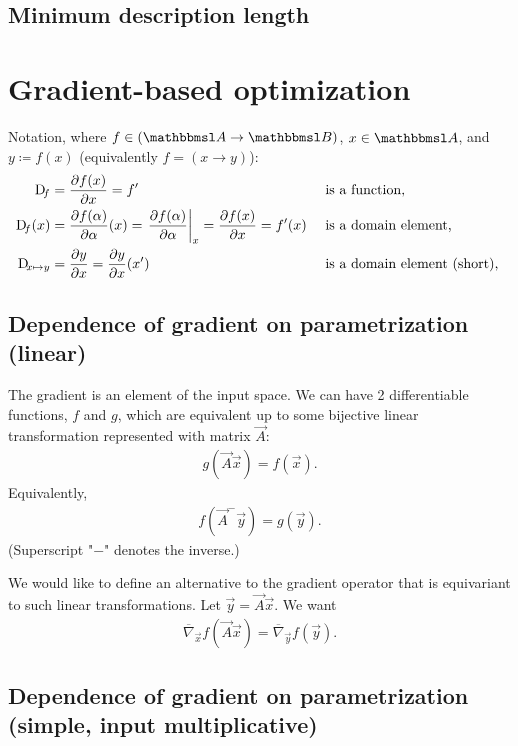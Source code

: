 \documentclass[oneside]{book}
\begin{document}
\subsection{Minimum description length}


\section{Gradient-based optimization}

Notation, where $f\in(\set A\to\set B)$, $x\in \set A$, and $y \coloneqq f(x)$ (equivalently $f=(x\to y)$):
\begin{align}
    \Dif_f &= \pd{f(x)}{x} = f' &&\text{ is a function,} \\
    \Dif_f(x) &= \pd{f(\alpha)}{\alpha}(x) = \eval{\pd{f(\alpha)}{\alpha}}_{x} = \pd{f(x)}{x} = f'(x) &&\text{ is a domain element, } \\
    \Dif_{x\mapsto y} &= \pd{y}{x} = \pd{y}{x}(x') &&\text{ is a domain element (short), }
\end{align}

\subsection{Dependence of gradient on parametrization (linear)}

The gradient is an element of the input space. We can have 2 differentiable functions, $f$ and $g$, which are equivalent up to some bijective linear transformation represented with matrix $\vec A$:
\begin{align}
g(\vec A\vec x) = f(\vec x) \text{.}
\end{align}
Equivalently,
\begin{align}
f(\vec A^{-}\vec y) = g(\vec y) \text{.}
\end{align}
(Superscript "$-$" denotes the inverse.)

We would like to define an alternative to the gradient operator that is equivariant to such linear transformations. Let $\vec y = \vec A\vec x$. We want
\begin{align}
\overline{\nabla}_{\vec x} f(\vec A \vec x) = \overline{\nabla}_{\vec y} f(\vec y) \text{.}
\end{align}




\subsection{Dependence of gradient on parametrization (simple, input multiplicative)}
\end{document}
